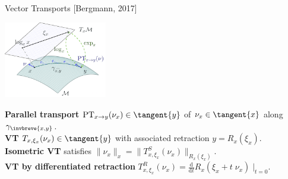\documentclass[9pt]{beamer}
\begin{document}
\begin{frame}{Vector Transports}
    \vspace{-1\baselineskip}\hfill{\tiny{[Bergmann, 2017]}}
    \begin{center}
        \includegraphics[width=4.5cm]{img/manifold-terms.png}
    \end{center}
    \textbf{Parallel transport} $\mathrm{PT}_{x \rightarrow y} (\nu_x) \in \tangent{y}$ of $\nu_x \in \tangent{x}$ along $\gamma_{\invbreve{x,y}}$. \\[0.15\baselineskip]
    \textbf{VT} $T_{x, \xi_x}(\nu_x) \in \tangent{y}$ with associated retraction $y = R_x(\xi_x)$. \\[0.15\baselineskip]
    \textbf{Isometric VT} satisfies $\lVert \nu_x \rVert_x = \lVert T^{S}_{x, \xi_x}(\nu_x) \rVert_{R_x(\xi_x)}$. \\[0.15\baselineskip]
    \textbf{VT by differentiated retraction} $T^{R}_{x, \xi_x}(\nu_x) = \frac{\mathrm{d}}{\mathrm{d}t} R_{x}(\xi_x + t \; \nu_x) \; \vert_{t=0}$.
\end{frame}
\end{document}
